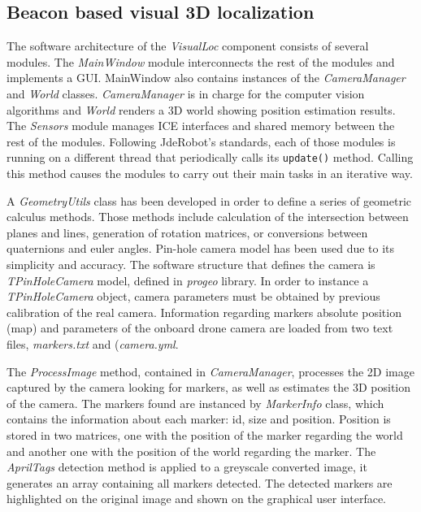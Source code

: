 \documentclass{styles/svproc}
\begin{document}
\subsection{Beacon based visual 3D localization}


	The software architecture of the \textit{VisualLoc} component consists of several modules. The \textit{MainWindow} module  interconnects the rest of the modules and implements a GUI. MainWindow also contains instances of the \textit{CameraManager} and \textit{World} classes. \textit{CameraManager} is in charge for the computer vision algorithms and \textit{World} renders a 3D world showing position estimation results. The \textit{Sensors} module manages ICE interfaces and shared memory between the rest of the modules. Following JdeRobot's standards, each of those modules is running on a different thread that periodically calls its \texttt{update()} method. Calling this method causes the modules to carry out their main tasks in an iterative way.
	
	A \textit{GeometryUtils} class has been developed in order to define a series of geometric calculus methods. Those methods include calculation of the intersection between planes and lines, generation of rotation matrices, or conversions between quaternions and euler angles. Pin-hole camera model has been used due to its simplicity and accuracy. The software structure that defines the camera is \textit{TPinHoleCamera} model, defined in \textit{progeo} library. %
In order to instance a \textit{TPinHoleCamera} object, camera parameters must be obtained by previous calibration of the real camera. Information regarding markers absolute position (map) and parameters of the onboard drone camera are loaded from two text files, \textit{markers.txt} and (\textit{camera.yml}.
	
	
	
	The \textit{ProcessImage} method, contained in \textit{CameraManager}, processes the 2D image captured by the camera looking for markers, as well as estimates the 3D position of the camera. The markers found are instanced by \textit{MarkerInfo} class, which contains the information about each marker: id, size and position. Position is stored in two matrices, one with the position of the marker regarding the world and another one with the position of the world regarding the marker. The \textit{AprilTags} detection method is applied to a greyscale converted image, it generates an array containing all markers detected. The detected markers are highlighted on the original image and shown on the graphical user interface.
	
\end{document}
